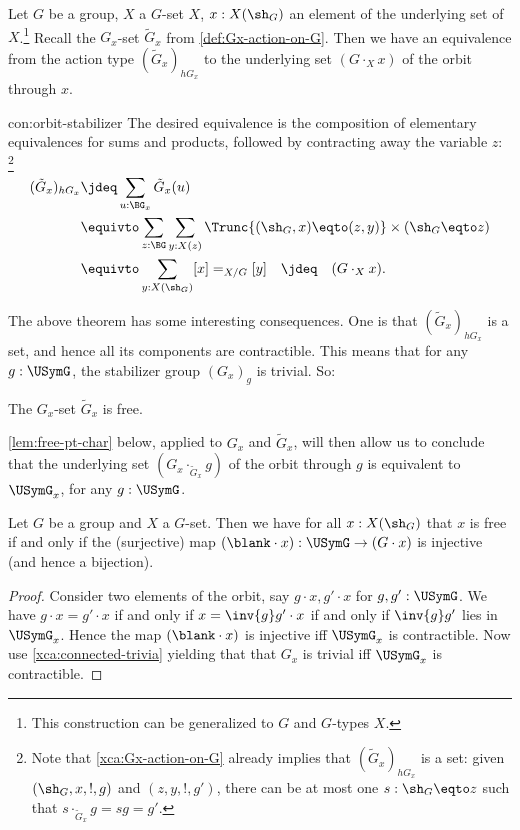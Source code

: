\begin{construction}
  \label{con:orbit-stabilizer}
  Let $G$ be a group, $X$ a $G$-set $X$,
  $x : X(\sh_G)$ an element of the underlying set of $X$.\footnote{%
  This construction can be generalized to \inftygps $G$ and $G$-types $X$.}
  Recall the $G_x$-set $\tilde G_x$ from \cref{def:Gx-action-on-G}.
  Then we have an equivalence from the action type $(\tilde G_x)_{hG_x}$
  to the underlying set $(G\cdot_X x)$ of the orbit through $x$.
\end{construction}
\begin{implementation}{con:orbit-stabilizer}
  The desired equivalence is the composition of elementary equivalences
  for sums and products, followed by contracting away the variable $z$:
\footnote{\label{ft:action-type-tildeGx-set} 
Note that \cref{xca:Gx-action-on-G} already
implies that $(\tilde G_x)_{hG_x}$ is a set:
given $(\sh_G,x,!,g)$ and $(z,y,!,g')$, there can be at most
one $s : \sh_G \eqto z$ such that $s\cdot_{\tilde G_x} g = sg = g'$. 
}
  \begin{align*}
    (\tilde G_x)_{hG_x}
    &\jdeq \sum_{u : \BG_x}\tilde G_x(u) \\
    &\equivto \sum_{z:\BG}\sum_{y:X(z)}
    \Trunc{(\sh_G,x) \eqto (z,y)}\times (\sh_G \eqto z) \\
    &\equivto \sum_{y:X(\sh_G)}[x] =_{X/G} [y]\quad\jdeq\quad(G\cdot_X x).\qedhere
  \end{align*}
\end{implementation}

The above theorem has some interesting consequences.
One is that $(\tilde G_x)_{hG_x}$ is a set, 
and hence all its components are contractible.
This means that for any $g:\USymG$, the stabilizer group $(G_x)_g$
is trivial. So:

\begin{corollary}\label{cor:action-subgrp-free}
 The $G_x$-set $\tilde G_x$ is free.
\end{corollary}

\cref{lem:free-pt-char} below, applied to $G_x$ and $\tilde G_x$,
will then allow us to conclude that the underlying set 
$(G_x \cdot_{\tilde G_x} g)$ of the orbit through $g$ is equivalent to 
$\USymG_x$, for any $g:\USymG$.

\begin{lemma}\label{lem:free-pt-char}
  Let $G$ be a group and $X$ a $G$-set. Then we have for all $x:X(\sh_G)$
  that $x$ is free if and only if the (surjective) map
  $(\blank \cdot x) : \USymG \to (G\cdot x)$ is injective
  (and hence a bijection).
\end{lemma}
\begin{proof}
  Consider two elements of the orbit, say $g\cdot x,g'\cdot x$ for $g,g':\USymG$.
  We have $g\cdot x=g' \cdot x$ if and only if $x = \inv{g} g'\cdot x$
  if and only if $\inv{g} g'$ lies in $\USymG_x$.
  Hence the map $(\blank \cdot x)$ is injective iff $\USymG_x$ is contractible.
  Now use \cref{xca:connected-trivia} yielding that that 
  $G_x$ is trivial iff $\USymG_x$ is contractible.
\end{proof}

